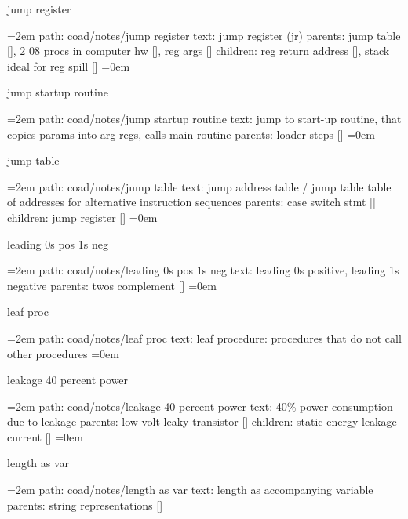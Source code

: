 jump register
\smallskip
\par\begingroup
\leftskip=2em
path: coad/notes/jump register
\smallskip
text:  jump register (jr)
\smallskip
parents:  jump table [], 2 08 procs in computer hw [], reg args []
\smallskip
children: reg return address [], stack ideal for reg spill []
\smallskip
\leftskip=0em
\par\endgroup
\bigskip
{}
jump startup routine
\smallskip
\par\begingroup
\leftskip=2em
path: coad/notes/jump startup routine
\smallskip
text:  jump to start-up routine, that copies params into arg regs, calls main routine
\smallskip
parents:  loader steps []
\smallskip
\leftskip=0em
\par\endgroup
\bigskip
{}
jump table
\smallskip
\par\begingroup
\leftskip=2em
path: coad/notes/jump table
\smallskip
text:  jump address table / jump table table of addresses for alternative instruction sequences
\smallskip
parents:  case switch stmt []
\smallskip
children: jump register []
\smallskip
\leftskip=0em
\par\endgroup
\bigskip
{}
leading 0s pos 1s neg
\smallskip
\par\begingroup
\leftskip=2em
path: coad/notes/leading 0s pos 1s neg
\smallskip
text:  leading 0s positive, leading 1s negative
\smallskip
parents:  twos complement []
\smallskip
\leftskip=0em
\par\endgroup
\bigskip
{}
leaf proc
\smallskip
\par\begingroup
\leftskip=2em
path: coad/notes/leaf proc
\smallskip
text:  leaf procedure: procedures that do not call other procedures
\smallskip
\leftskip=0em
\par\endgroup
\bigskip
{}
leakage 40 percent power
\smallskip
\par\begingroup
\leftskip=2em
path: coad/notes/leakage 40 percent power
\smallskip
text:  40\% power consumption due to leakage
\smallskip
parents:  low volt leaky transistor []
\smallskip
children: static energy leakage current []
\smallskip
\leftskip=0em
\par\endgroup
\bigskip
{}
length as var
\smallskip
\par\begingroup
\leftskip=2em
path: coad/notes/length as var
\smallskip
text:  length as accompanying variable
\smallskip
parents:  string representations []
